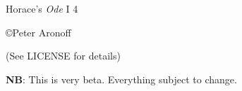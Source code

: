 \begin{titlepage}

\begin{center}

\huge Horace's \textit{Ode} I 4

\vskip2in

\large \copyright Peter Aronoff \the\year

(See LICENSE for details)

\vskip1in

\textbf{NB}: This is very beta. Everything subject to change.

\vskip2in

\newpage

\end{center}

\end{titlepage}
